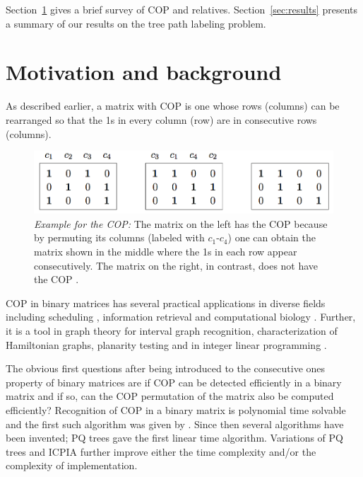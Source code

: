 \documentclass[MS,synopsis]{iitmdiss}
\begin{document}

Section~\ref{sec:motivation} gives a brief survey of COP and relatives.
Section~\ref{sec:results} presents a summary of our results on the
tree path labeling problem.

\section{Motivation and background}
\label{sec:motivation}

As described earlier, a matrix with COP is one whose rows (columns)
can be rearranged so that the 1s in every column (row) are in
consecutive rows (columns).

\begin{figure}[htbp]
  \centering
  \includegraphics[scale=0.4]{../img/0_cop_nocop.png}
  
  \caption{{\em Example for the COP:} The matrix on the left has the
    COP because by permuting its columns (labeled with $c_1$-$c_4$)
    one can obtain the matrix shown in the middle where the 1s in each
    row appear consecutively. The matrix on the right, in contrast,
    does not have the COP \cite{at72,d08phd}.}
  \label{fig:cop-matrix}
\end{figure}

COP in binary matrices has several practical applications in diverse
fields including scheduling \cite{hl06}, information retrieval
\cite{k77} and computational biology \cite{abh98}.  Further, it is a
tool in graph theory \cite{mcg04} for interval graph recognition,
characterization of Hamiltonian graphs, planarity testing \cite{bl76}
and in integer linear programming \cite{ht02,hl06}.


The obvious first questions after being introduced to the consecutive
ones property of binary matrices are if COP can be detected
efficiently in a binary matrix and if so, can the COP permutation of
the matrix also be computed efficiently?  Recognition of COP in a
binary matrix is polynomial time solvable and the first such algorithm
was given by \cite{fg65}.  Since then several algorithms have been
invented; PQ trees \cite{bl76} gave the first linear time
algorithm. Variations of PQ trees \cite{mm96,wlh01,wlh02,mcc04} and
ICPIA \cite{nsnrs09} further improve either the time complexity and/or
the complexity of implementation.
\end{document}
